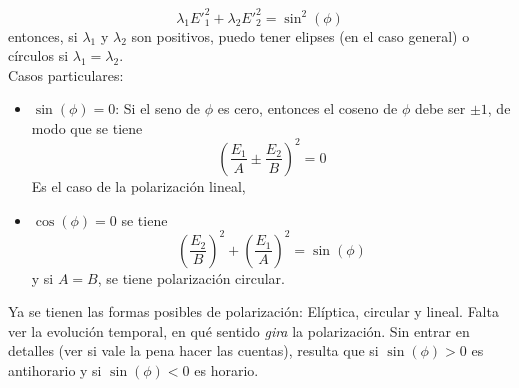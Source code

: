 \begin{equation*}
    \lambda_{1}{E'}_{1}^{2} +\lambda_{2}{E'}_{2}^{2} = \sin^{2}{(\phi)}
\end{equation*}
entonces, si $\lambda_{1}$ y $\lambda_{2}$ son positivos, puedo tener elipses (en el caso general) o círculos si $\lambda_{1} = \lambda_{2}$.\\
\indent Casos particulares:
\begin{itemize}
    \item $\sin{(\phi)} = 0$: Si el seno de $\phi$ es cero, entonces el coseno de $\phi$ debe ser $\pm 1$, de modo que se tiene
    \begin{equation*}
        \left(
            \frac{E_{1}}{A} \pm \frac{E_{2}}{B}
        \right)^{2}
        = 0
    \end{equation*}
    Es el caso de la polarización lineal,
    \item $\cos{(\phi)} = 0$ se tiene
    \begin{equation*}
        \left(
        \frac{E_{2}}{B}
    \right)^{2}
    +
    \left(
        \frac{E_{1}}{A}
    \right)^{2}
    = \sin{(\phi)}
    \end{equation*}
    y si $A = B$, se tiene polarización circular.
\end{itemize}
Ya se tienen las formas posibles de polarización: Elíptica, circular y lineal. Falta ver la evolución temporal, en qué sentido \textit{gira} la polarización. Sin entrar en detalles (ver si vale la pena hacer las cuentas), resulta que si $\sin{(\phi)} > 0$ es antihorario y si $\sin{(\phi)} < 0$ es horario.




